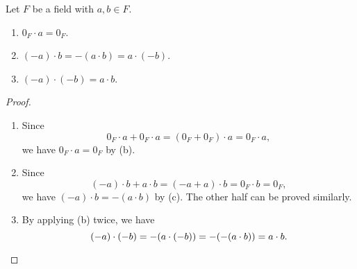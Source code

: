 \begin{proposition}\label{prop:multiplication-of-inverses}
  Let $F$ be a field with $a, b \in F$.
  \begin{enumerate}
    \item $0_F \cdot a = 0_F$.
    \item $(-a) \cdot b = -(a \cdot b) = a \cdot (-b)$.
    \item $(-a) \cdot (-b) = a \cdot b$.
  \end{enumerate}
\end{proposition}
\begin{proof} \leavevmode
  \begin{enumerate}
    \item Since
      \begin{equation*}
        0_F \cdot a + 0_F \cdot a
        = (0_F + 0_F) \cdot a
        = 0_F \cdot a,
      \end{equation*}
      we have $0_F \cdot a = 0_F$ by  (b).
    \item Since
      \begin{equation*}
        (-a) \cdot b + a \cdot b
        = (-a + a) \cdot b
        = 0_F \cdot b
        = 0_F,
      \end{equation*}
      we have $(-a) \cdot b = -(a \cdot b)$ by
       (c).
      The other half can be proved similarly.
    \item By applying (b) twice, we have
      \begin{equation*}
        (-a) \cdot (-b)
        = -(a \cdot (-b))
        = -(-(a \cdot b))
        = a \cdot b. \qedhere
      \end{equation*}
  \end{enumerate}
\end{proof}

